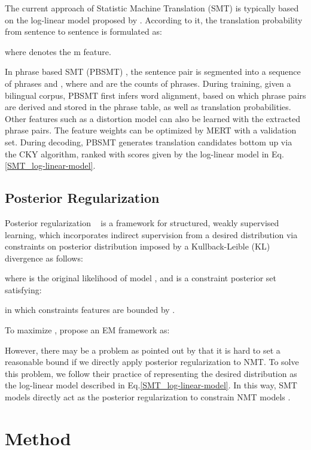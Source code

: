 \documentclass[letterpaper]{article} \usepackage{aaai19}  \usepackage{times}  \usepackage{helvet}  \usepackage{courier}  \usepackage{url}  \usepackage{graphicx}  \usepackage{amsmath}
\newcommand{\newref}[1]{Eq.\eqref{#1}}
\begin{document}
The current approach of Statistic Machine Translation (SMT) is typically based on the log-linear model proposed by \citeauthor{och2002discriminative} . According to it, the translation probability from sentence  to sentence  is formulated as:

where  denotes the m feature.


In phrase based SMT (PBSMT) \cite{koehn2003statistical}, the sentence pair is segmented into a sequence of phrases  and , where  and  are the counts of phrases. During training, given a bilingual corpus, PBSMT first infers word alignment, based on which phrase pairs are derived and stored in the phrase table, as well as translation probabilities. 
Other features such as a distortion model 
can also be learned with the extracted phrase pairs.
The feature weights  can be optimized by MERT \cite{och2003minimum} with a validation set. 
During decoding, PBSMT generates translation candidates  bottom up via the CKY algorithm, ranked with scores given by the log-linear model in \newref{SMT_log-linear-model}. 

\subsection{Posterior Regularization}
Posterior regularization ~\cite{ganchev2010posterior} is a framework for structured, weakly supervised learning, which incorporates indirect supervision from a desired distribution  via constraints on posterior distribution  imposed by a Kullback-Leible (KL) divergence as follows:

where  is the original likelihood of model , and  is a constraint posterior set satisfying:

in which constraints features  are bounded by .

To maximize , \citeauthor{ganchev2010posterior}  propose an EM framework \cite{mclachlan2007algorithm} as:


However, there may be a problem as pointed out by \citeauthor{zhang2017prior}  that it is hard to set a reasonable bound  if we directly apply posterior regularization to NMT. To solve this problem, we follow their practice of representing the desired distribution  as the log-linear model described in \newref{SMT_log-linear-model}. In this way, SMT models directly act as the posterior regularization to constrain NMT models .


\section{Method}
\end{document}
